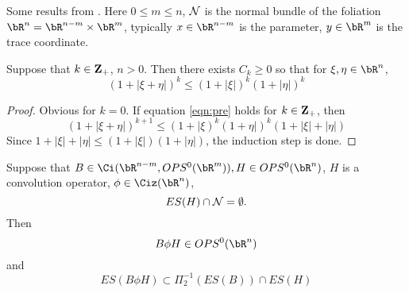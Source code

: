 Some results from \cite{BaoSy:91b}. Here $0 \le m \le n$, ${\cal N}$ is the normal bundle of the foliation $\bR^n = \bR^{n-m} \times \bR^m$, typically $x \in \bR^{n-m}$ is the parameter, $y \in \bR^m$ is the trace coordinate.

\begin{lemma}
\label{thm:prebao}
Suppose that $k \in {\bf Z}_+$, $n > 0$. Then there exists $C_{k} \ge 0$ so that for $\xi, \eta \in \bR^n$,
\begin{equation}
  \label{eqn:pre}
  (1 + |\xi + \eta|)^{k} \le (1 + |\xi|)^{k} (1 + |\eta|)^{k}
\end{equation}
\end{lemma}
\begin{proof}
  Obvious for $k = 0$. If equation \ref{eqn:pre} holds for $k \in {\bf Z}_+$, then
  \[
    (1 + |\xi + \eta|)^{k+1} \le (1 + |\xi)^{k}(1+ \eta|)^{k}(1+|\xi| + |\eta|)
  \]
  Since $1+|\xi| + |\eta| \le (1+|\xi|)(1 + |\eta|)$, the induction step is done.
\end{proof}

\begin{proposition}
  \label{thm:bao1}
  Suppose that $B \in \Ci(\bR^{n-m},OPS^0(\bR^m)), H \in OPS^0(\bR^n)$, $H$ is a convolution operator, $\phi \in \Ciz(\bR^n)$,
  \[
    ES(H) \cap {\cal N} = \emptyset.
  \]
  Then
  \[
    B\phi H \in OPS^0(\bR^n)
  \]
  and
  \[
    ES(B\phi H) \subset \Pi_2^{-1}(ES(B)) \cap ES(H)
  \]
\end{proposition}

